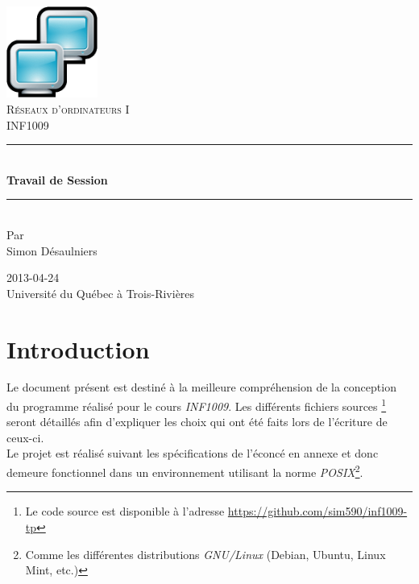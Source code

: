 \documentclass[11pt,french]{article}
\newcommand{\HRule}{\rule{\linewidth}{0.5mm}}
\begin{document}
    \begin{titlepage}
        \begin{center}
    
            \includegraphics[height=3cm]{./aux/network.png}
            \\[3cm]
            
            \textsc{\LARGE Réseaux d'ordinateurs I}
            \\[0.2cm]
            \textsc{\Large INF1009}
            \\[2cm]
            \HRule \\[0.5cm]
            {\huge \bfseries Travail de Session}
            \HRule \\[2cm]
            Par\\
            Simon Désaulniers

            \vfill
            2013-04-24\\
            Université du Québec à Trois-Rivières
            \thispagestyle{empty}
        \end{center}
    \end{titlepage}
    \newpage

    \setcounter{page}{1}
    \tableofcontents
    \newpage

    \setcounter{page}{1}
    
    \section*{Introduction} %
    \label{sec:intro}
        Le document présent est destiné à la meilleure compréhension de la conception
        du programme réalisé pour le cours \emph{INF1009}. Les différents fichiers sources
        \footnote{Le code source est disponible à l'adresse {\color{blue}\href{https://github.com/sim590/inf1009-tp}{https://github.com/sim590/inf1009-tp}}}
        seront détaillés afin d'expliquer les choix qui ont été faits lors de l'écriture
        de ceux-ci.\\

        Le projet est réalisé suivant les spécifications de l'éconcé en annexe et donc demeure
        fonctionnel dans un environnement utilisant la norme \emph{POSIX}\footnote{Comme les
        différentes distributions \emph{GNU/Linux} (Debian, Ubuntu, Linux Mint, etc.)}.
    
\end{document}
